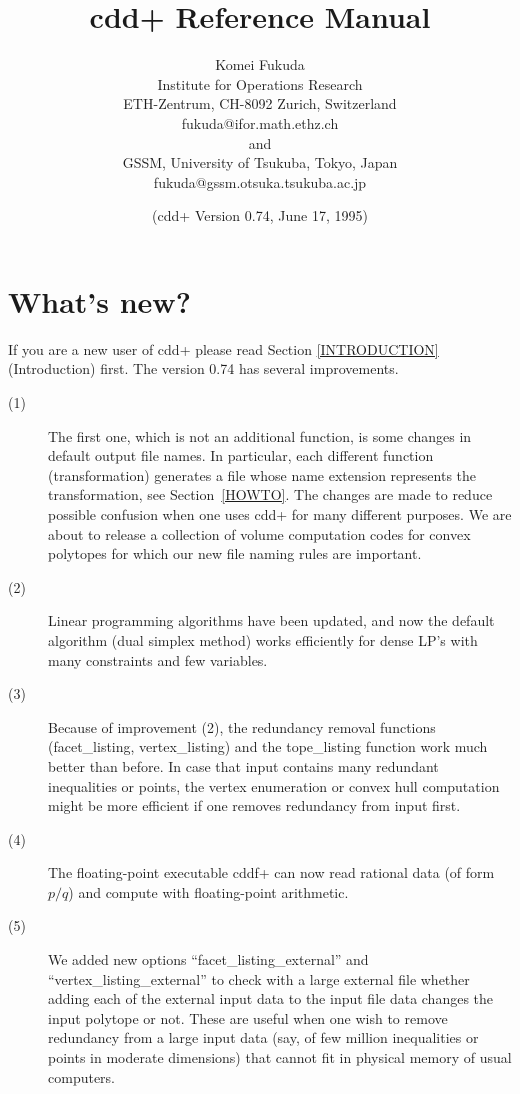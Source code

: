 \documentclass[11pt]{article}
\begin{document}
\title{cdd+ Reference Manual}
\author{
Komei Fukuda \\
Institute for Operations Research\\
ETH-Zentrum, CH-8092 Zurich, Switzerland\\
fukuda@ifor.math.ethz.ch \\and\\
GSSM, University of Tsukuba, Tokyo, Japan\\
fukuda@gssm.otsuka.tsukuba.ac.jp
}
\date{ (cdd+ Version 0.74,  June 17, 1995)}

\maketitle

\section{What's new?}
If you are a new user of cdd+ please read Section \ref{INTRODUCTION} (Introduction) first.
The version 0.74 has several improvements.  
\begin{description}
\item[(1)] The first one, which is not an additional
function, is some changes in default output file names.  In particular, each different
function (transformation) generates a file whose name extension
 represents the transformation, see Section~\ref{HOWTO}.
The changes are made to reduce possible confusion when one uses cdd+
for many different purposes.  We are about to release
a collection of volume computation codes \cite{befl-cevcm-95} for convex polytopes 
for which our new file naming rules are important. 
\item[(2)] Linear programming algorithms have been updated, and now the default
algorithm (dual simplex method) works efficiently for dense LP's with many constraints
and few variables.
\item[(3)] Because of improvement (2), the redundancy removal functions (facet\_listing,
vertex\_listing) and the tope\_listing function work much better than before.
In case that input contains many redundant inequalities or points,
the vertex enumeration or convex hull computation might be more
efficient if one removes redundancy from input first.
\item[(4)] The floating-point executable cddf+ can now read rational
data (of form $p / q$) and compute with floating-point arithmetic.
\item[(5)] We added new options ``facet\_listing\_external'' and ``vertex\_listing\_external'' to
check with a large external file whether adding each of the external input data
 to the input file data changes the input polytope or not.  These are useful
when one wish to remove redundancy from a large input data
(say, of few million inequalities or points in moderate dimensions) that
cannot fit in physical memory of usual computers.
\end{description}
\end{document}
